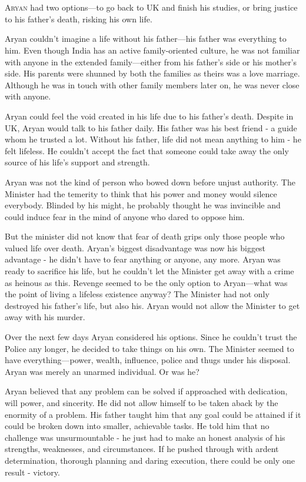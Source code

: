\chapter{}

\lettrine{A}{ryan} had two options—to go back to UK and finish his studies, or
bring justice to his father's death, risking his own life.

Aryan couldn't imagine a life without his father—his father was everything to
him. Even though India has an active family-oriented culture, he was not
familiar with anyone in the extended family—either from his father's side or
his mother's side. His parents were shunned by both the families as theirs was
a love marriage. Although he was in touch with other family members later on, he
was never close with anyone.

Aryan could feel the void created in his life due to his father's death. Despite
in UK, Aryan would talk to his father daily. His father was his best friend - a
guide whom he trusted a lot. Without his father, life did not mean anything to
him - he felt lifeless. He couldn't accept the fact that someone could take away
the only source of his life's support and strength.

Aryan was not the kind of person who bowed down before unjust authority. The
Minister had the temerity to think that his power and money would silence
everybody. Blinded by his might, he probably thought he was invincible and could
induce fear in the mind of anyone who dared to oppose him.

But the minister did not know that fear of death grips only those people who
valued life over death. Aryan's biggest disadvantage was now his biggest
advantage - he didn't have to fear anything or anyone, any more. Aryan was ready
to sacrifice his life, but he couldn't let the Minister get away with a crime as
heinous as this. Revenge seemed to be the only option to Aryan—what was the
point of living a lifeless existence anyway? The Minister had not only destroyed
his father's life, but also his. Aryan would not allow the Minister to get away
with his murder.

Over the next few days Aryan considered his options. Since he couldn't trust the
Police any longer, he decided to take things on his own. The Minister seemed to
have everything—power, wealth, influence, police and thugs under his disposal.
Aryan was merely an unarmed individual. Or was he?

Aryan believed that any problem can be solved if approached with dedication,
will power, and sincerity. He did not allow himself to be taken aback by the
enormity of a problem. His father taught him that any goal could be attained if
it could be broken down into smaller, achievable tasks. He told him that no
challenge was unsurmountable - he just had to make an honest analysis of his
strengths, weaknesses, and circumstances. If he pushed through with ardent
determination, thorough planning and daring execution, there could be only one
result - victory.

